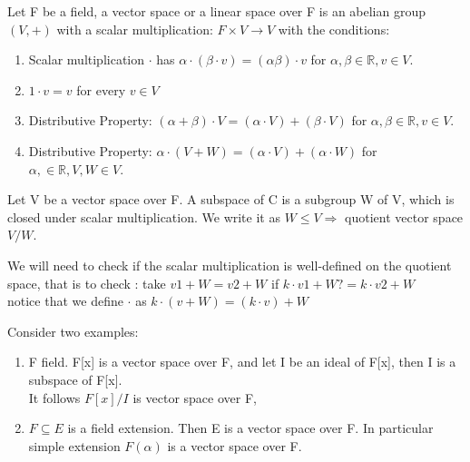 \documentclass{article}
\newcommand\R{\ensuremath{\mathbb{R}}}
\begin{document}
\begin{Def}
    Let F be a field, a vector space or a linear space over F is an abelian group $(V, +)$ with a scalar multiplication:
    $F\times V \rightarrow V$ with the conditions:
    \begin{enumerate}
        \item Scalar multiplication $\cdot$ has $\alpha \cdot (\beta \cdot v) = (\alpha\beta) \cdot v$ for $\alpha, \beta \in \R, v\in V$. 
        \item $1 \cdot v = v$ for every $v \in V$
        \item Distributive Property:
        $(\alpha + \beta) \cdot V = (\alpha \cdot V) + (\beta \cdot V)$ for $\alpha, \beta \in \R, v\in V$.
        \item Distributive Property: 
        $\alpha \cdot (V+W) = (\alpha \cdot V) + (\alpha \cdot W)$ for $\alpha,  \in \R, V, W\in V$.
    \end{enumerate}
\end{Def}
\begin{Def}
    Let V be a vector space over F. A subspace of C is a subgroup W of V, which is closed under scalar multiplication. We write it as $W\leq V \Rightarrow$ quotient vector space $V/W$. 
\end{Def}
\begin{note}
    We will need to check if the scalar multiplication is well-defined on the quotient space, that is to check : take $v1 + W = v2+ W$ if $k \cdot v1 + W ?= k \cdot v2 + W$ 
    \\ notice that we define $\cdot$ as $k\cdot (v+W) = (k \cdot v) + W$ 
\end{note}
\begin{Example}
Consider two examples:
    \begin{enumerate}
        \item F field. F[x] is a vector space over F, and let I be an ideal of F[x], then I is a subspace of F[x].
        \\It follows $F[x]/I$ is vector space over F,
        \item 
        $F \subseteq E$ is a field extension. Then E is a vector space over F.
        In particular simple extension $F(\alpha)$ is a vector space over F.
    \end{enumerate}
\end{Example}
\end{document}

